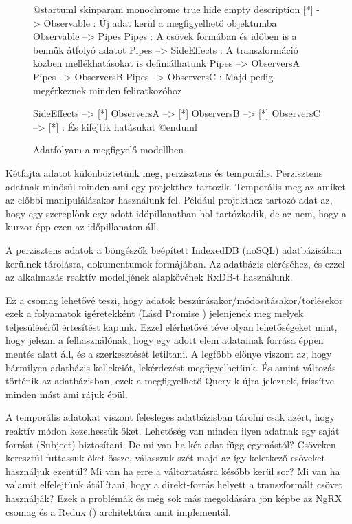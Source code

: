 \begin{figure}[h!]
	\centering
	\begin{plantuml}
		@startuml
		skinparam monochrome true
		hide empty description
		[*] -> Observable : Új adat kerül a megfigyelhető objektumba
		Observable --> Pipes
		Pipes : A csövek formában és időben is  a bennük átfolyó adatot
		Pipes --> SideEffects : A transzformáció közben mellékhatásokat is definiálhatunk
		Pipes --> ObserversA
		Pipes --> ObserversB
		Pipes --> ObserversC : Majd pedig megérkeznek minden feliratkozóhoz

		SideEffects  --> [*]
		ObserversA --> [*]
		ObserversB --> [*]
		ObserversC --> [*] : És kifejtik hatásukat
		@enduml
	\end{plantuml}
	\caption{Adatfolyam a megfigyelő modellben}
	\label{fig:observer-pattern}
\end{figure}

Kétfajta adatot különböztetünk meg, perzisztens és temporális. Perzisztens adatnak minősül minden ami egy projekthez tartozik. Temporális meg az amiket az előbbi manipulálásakor használunk fel. Például projekthez tartozó adat az, hogy egy szereplőnk egy adott időpillanatban hol tartózkodik, de az nem, hogy a kurzor épp ezen az időpillanaton áll.

A perzisztens adatok a böngészők beépített IndexedDB (noSQL) adatbázisában kerülnek tárolásra, dokumentumok formájában. Az adatbázis eléréséhez, és ezzel az alkalmazás reaktív modelljének alapkövének RxDB-t \cite{RxDB} használunk.

Ez a csomag lehetővé teszi, hogy adatok beszúrásakor/módosításakor/törlésekor ezek a folyamatok igéretekként (Lásd Promise \cite{Promise}) jelenjenek meg melyek teljesüléséről értesítést kapunk. Ezzel elérhetővé téve olyan lehetőségeket mint, hogy jelezni a felhasználónak, hogy egy adott elem adatainak forrása éppen mentés alatt áll, és a szerkesztését letiltani. A legfőbb előnye viszont az, hogy bármilyen adatbázis kollekciót, lekérdezést megfigyelhetünk. És amint változás történik az adatbázisban, ezek a megfigyelhető Query-k újra jeleznek, frissítve minden mást ami rájuk épül.

A temporális adatokat viszont felesleges adatbázisban tárolni csak azért, hogy reaktív módon kezelhessük őket. Lehetőség van minden ilyen adatnak egy saját forrást (Subject) biztosítani. De mi van ha két adat függ egymástól? Csöveken keresztül futtassuk őket össze, válasszuk szét majd az így keletkező csöveket használjuk ezentúl? Mi van ha erre a változtatásra később kerül sor? Mi van ha valamit elfelejtünk átállítani, hogy a direkt-forrás helyett a transzformált csövet használják? Ezek a problémák és még sok más megoldására jön képbe az NgRX \cite{NgRx} csomag és a Redux (\cite{Redux}) architektúra amit implementál.

